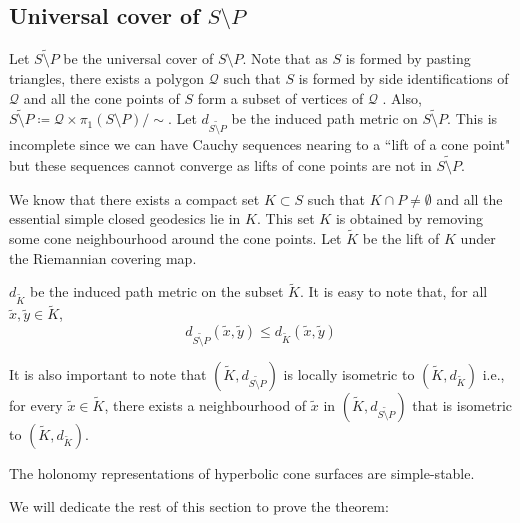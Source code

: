 \subsection*{Universal cover of $S \setminus P$}

Let $\widetilde{S \setminus P}$ be the universal cover of $S \setminus 	P$. Note that as $S$ is formed by pasting triangles, there exists a polygon $\mathcal{Q}$ such that $S$ is formed by side identifications of $\mathcal{Q}$ and all the cone points of $S$ form a subset of vertices of $\mathcal{Q}$ . Also, $\widetilde{S \setminus P} \coloneqq \mathcal{Q} \times \pi_1(S \setminus P) / \sim$. Let $d_{\widetilde{S \setminus P}}$ be the induced path metric on $\widetilde{S \setminus P}$. This is incomplete since we can have Cauchy sequences nearing to a ``lift of a cone point" but these sequences cannot converge as lifts of cone points are not in $\widetilde{S \setminus P}$.


We know that there exists a compact set $K \subset S$ such that $K \cap P \neq \emptyset$ and all the essential simple closed geodesics lie in $K$. This set $K$ is obtained by removing some cone neighbourhood around the cone points. Let $\widetilde{K}$ be the lift of $K$ under the Riemannian covering map.  

$d_{\tilde{K}}$ be the induced path metric on the subset $\tilde{K}$. It is easy to note that, for all $\tilde{x},\tilde{y} \in \tilde{K}$, \[d_{\widetilde{S \setminus P}}(\tilde{x},\tilde{y}) \leq d_{\tilde{K}}(\tilde{x},\tilde{y})\]

It is also important to note that $(\tilde{K}, d_{\widetilde{S \setminus P}})$ is locally isometric to $(\tilde{K},d_{\tilde{K}})$ i.e., for every $\tilde{x} \in \tilde{K}$, there exists a neighbourhood of $\tilde{x}$ in $(\tilde{K},d_{\widetilde{S \setminus P}})$ that is isometric to $(\tilde{K},d_{\tilde{K}})$. 

\begin{theorem}
	The holonomy representations of hyperbolic cone surfaces are simple-stable.
\end{theorem}

We will dedicate the rest of this section to prove the theorem:

